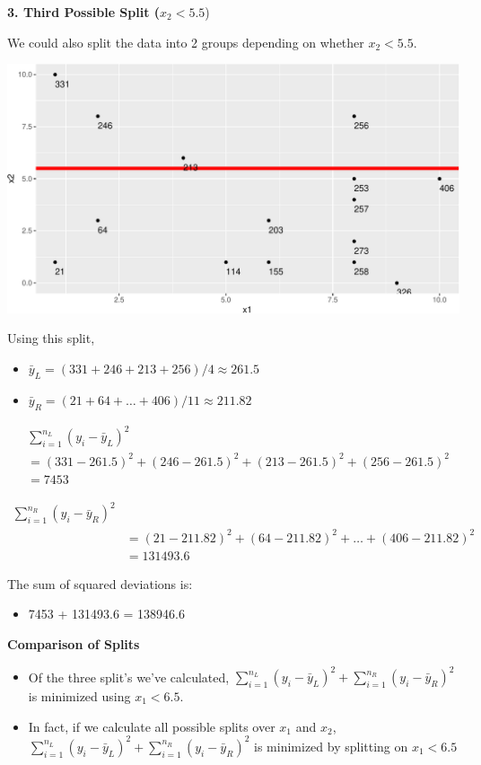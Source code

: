 \documentclass[
  letterpaper,
  DIV=11,
  numbers=noendperiod]{scrreprt}
\providecommand{\tightlist}{%
  \setlength{\itemsep}{0pt}\setlength{\parskip}{0pt}}\usepackage{longtable,booktabs,array}
\begin{document}
\textbf{3. Third Possible Split (}\(x_2 < 5.5\))

We could also split the data into 2 groups depending on whether
\(x_2 < 5.5\).

\includegraphics{Ch7_files/figure-pdf/unnamed-chunk-54-1.pdf}

Using this split,

\begin{itemize}
\tightlist
\item
  \(\bar{y}_L = (331+246+213+256)/4 \approx 261.5\)\\
\item
  \(\bar{y}_R = (21 + 64 + \ldots + 406)/11 \approx 211.82\)
\end{itemize}

\[
\begin{aligned}
& \displaystyle\sum_{i=1}^{n_L} (y_i -\bar{y}_L)^2  \\
& =(331-261.5)^2+(246-261.5)^2 + (213-261.5)^2+(256-261.5)^2 \\
& =7453
\end{aligned}
\]

\[
\begin{aligned}
\displaystyle\sum_{i=1}^{n_R} (y_i -\bar{y}_R)^2 \\
& =(21-211.82)^2+(64-211.82)^2 + \ldots+(406-211.82)^2 \\
& =131493.6
\end{aligned}
\]

The sum of squared deviations is:

\begin{itemize}
\tightlist
\item
  7453 + 131493.6 = 138946.6
\end{itemize}

\textbf{Comparison of Splits}

\begin{itemize}
\item
  Of the three split's we've calculated,
  \(\displaystyle\sum_{i=1}^{n_L} (y_i -\bar{y}_L)^2 + \displaystyle\sum_{i=1}^{n_R} (y_i -\bar{y}_R)^2\)
  is minimized using \(x_1 < 6.5\).
\item
  In fact, if we calculate all possible splits over \(x_1\) and \(x_2\),
  \(\displaystyle\sum_{i=1}^{n_L} (y_i -\bar{y}_L)^2 + \displaystyle\sum_{i=1}^{n_R} (y_i -\bar{y}_R)^2\)
  is minimized by splitting on \(x_1 < 6.5\)
\end{itemize}
\end{document}

